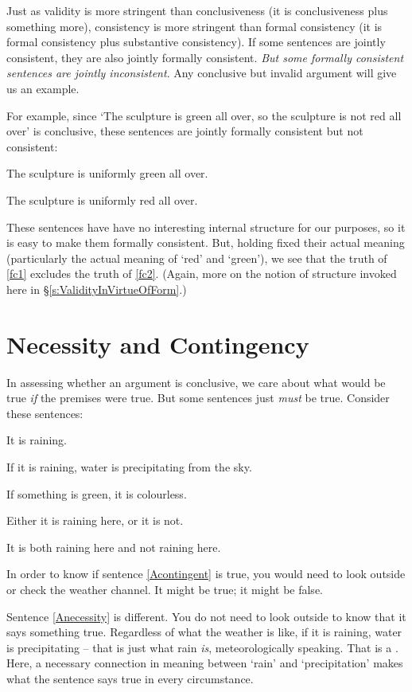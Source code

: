Just as validity is more stringent than conclusiveness (it is conclusiveness plus something more), consistency is more stringent than formal consistency (it is formal consistency plus substantive consistency). If some sentences are jointly consistent, they are also jointly formally consistent. \emph{But some formally consistent sentences are jointly inconsistent}. Any conclusive but invalid argument will give us an example. 

For example, since `The sculpture is green all over, so the sculpture is not red all over' is conclusive, these sentences are jointly formally consistent but not consistent: \begin{earg}
	\item[\ex{fc1}] The sculpture is uniformly green all over.
	\item[\ex{fc2}] The sculpture is uniformly red all over.
\end{earg}
These sentences have have no interesting internal structure for our purposes, so it is easy to make them formally consistent. But, holding fixed their actual meaning (particularly the actual meaning of `red' and `green'), we see that the truth of \ref{fc1} excludes the truth of \ref{fc2}. (Again, more on the notion of structure invoked here in §\ref{s:ValidityInVirtueOfForm}.)

\section{Necessity and Contingency}\label{s:neccandcont}
In assessing whether an argument is conclusive, we care about what would be true \emph{if} the premises were true. But some sentences just \emph{must} be true. Consider these sentences:
	\begin{earg}
		\item[\ex{Acontingent}] It is raining.
		\item[\ex{Anecessity}] If it is raining, water is precipitating from the sky.
		\item[\ex{imposs}] If something is green, it is colourless.
		\item[\ex{Alogical truth}] Either it is raining here, or it is not.
		\item[\ex{Acontradiction}] It is both raining here and not raining here.
	\end{earg}
In order to know if sentence \ref{Acontingent} is true, you would need to look outside or check the weather channel. It might be true; it might be false.

Sentence \ref{Anecessity} is different. You do not need to look outside to know that it says something true. Regardless of what the weather is like, if it is raining, water is precipitating – that is just what rain \emph{is}, meteorologically speaking. That is a . Here, a necessary connection in meaning between `rain' and `precipitation' makes what the sentence says true in every circumstance.

